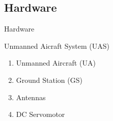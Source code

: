 \subsection{Hardware}

\begin{frame}{Hardware}{}
  \begin{block}{Unmanned Aicraft System (UAS)}
    \begin{enumerate}
      \item Unmanned Aircraft (UA)
      \item Ground Station (GS)
      \item Antennas
      \item DC Servomotor
    \end{enumerate}
  \end{block}
\end{frame}

